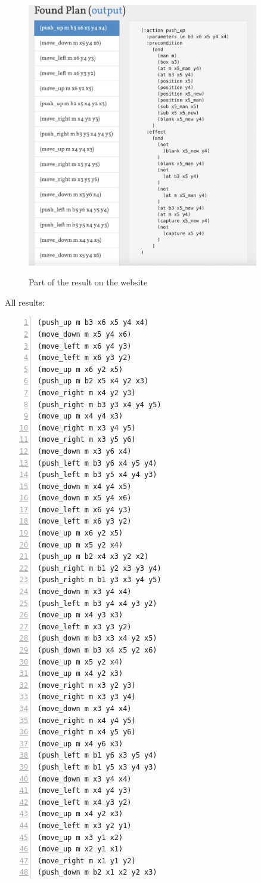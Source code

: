\documentclass[a4paper, 11pt]{article}
\begin{document}
\begin{figure}[ht]
  \centering
  \includegraphics[width=0.9\textwidth]{Pic/1}
  \qquad
  \parbox[b]{0.6\textwidth}{Part of the result on the website\\}
\end{figure}
All results:
\begin{lstlisting}[title=result,frame=single,numbers=left]
(push_up m b3 x6 x5 y4 x4)
(move_down m x5 y4 x6)
(move_left m x6 y4 y3)
(move_left m x6 y3 y2)
(move_up m x6 y2 x5)
(push_up m b2 x5 x4 y2 x3)
(move_right m x4 y2 y3)
(push_right m b3 y3 x4 y4 y5)
(move_up m x4 y4 x3)
(move_right m x3 y4 y5)
(move_right m x3 y5 y6)
(move_down m x3 y6 x4)
(push_left m b3 y6 x4 y5 y4)
(push_left m b3 y5 x4 y4 y3)
(move_down m x4 y4 x5)
(move_down m x5 y4 x6)
(move_left m x6 y4 y3)
(move_left m x6 y3 y2)
(move_up m x6 y2 x5)
(move_up m x5 y2 x4)
(push_up m b2 x4 x3 y2 x2)
(push_right m b1 y2 x3 y3 y4)
(push_right m b1 y3 x3 y4 y5)
(move_down m x3 y4 x4)
(push_left m b3 y4 x4 y3 y2)
(move_up m x4 y3 x3)
(move_left m x3 y3 y2)
(push_down m b3 x3 x4 y2 x5)
(push_down m b3 x4 x5 y2 x6)
(move_up m x5 y2 x4)
(move_up m x4 y2 x3)
(move_right m x3 y2 y3)
(move_right m x3 y3 y4)
(move_down m x3 y4 x4)
(move_right m x4 y4 y5)
(move_right m x4 y5 y6)
(move_up m x4 y6 x3)
(push_left m b1 y6 x3 y5 y4)
(push_left m b1 y5 x3 y4 y3)
(move_down m x3 y4 x4)
(move_left m x4 y4 y3)
(move_left m x4 y3 y2)
(move_up m x4 y2 x3)
(move_left m x3 y2 y1)
(move_up m x3 y1 x2)
(move_up m x2 y1 x1)
(move_right m x1 y1 y2)
(push_down m b2 x1 x2 y2 x3)
\end{lstlisting}


%
%
\end{document}
